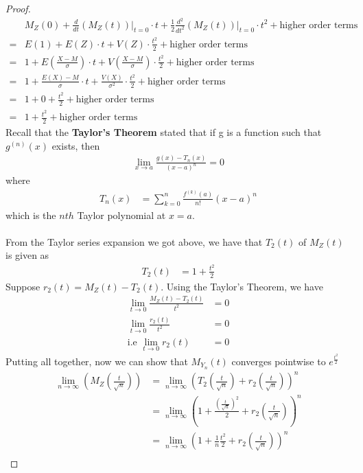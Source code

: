\documentclass[11pt,oneside]{book}
\theoremstyle{break}
\theoremstyle{break}
\begin{document}
\begin{proof}
\begin{align*}
&M_Z(0)+\frac{d}{dt}\left. \left(M_Z(t) \right)\right|_{t=0}\cdot t +\frac{1}{2}\frac{d^2}{dt^2}\left. \left(M_Z(t) \right)\right|_{t=0}\cdot t^2+\text{higher order terms}\\
=&E(1)+E(Z)\cdot t+V(Z)\cdot \frac{t^2}{2}+\text{higher order terms}\\
=&1+E\left(\frac{X-M}{\sigma} \right)\cdot t+V\left(\frac{X-M}{\sigma}\right)\cdot \frac{t^2}{2}+\text{higher order terms}\\
=&1+\frac{E(X)-M}{\sigma}\cdot t+\frac{V(X)}{\sigma^2}\cdot\frac{t^2}{2}+\text{higher order terms}\\
=&1+0+ \frac{t^2}{2}+\text{higher order terms}\\
=&1+\frac{t^2}{2}+\text{higher order terms}
\end{align*}
Recall that the \textbf{Taylor's Theorem} stated that if g is a function such that $g^{(n)}(x)$ exists, then \begin{align*}
\lim_{x\to a}\frac{g(x)-T_n(x)}{(x-a)^n}=0
\end{align*}
where \begin{align*}
T_n(x)&=\sum_{k=0}^{n}\frac{f^{(k)}(a)}{n!}(x-a)^n
\end{align*}
which is the $nth$ Taylor polynomial at $x=a$.\\
\hfill\\
From the Taylor series expansion we got above, we have that $T_2(t)$ of $M_Z(t)$ is given as \begin{align*}
T_2(t)&=1+\frac{t^2}{2}
\end{align*}
Suppose $r_2(t)=M_Z(t)-T_2(t)$. Using the Taylor's Theorem, we have \begin{align*}
\lim_{t\to 0}\frac{M_Z(t)-T_2(t)}{t^2}&=0\\
\lim_{t\to 0}\frac{r_2(t)}{t^2}&=0\\
\text{i.e }\lim_{t\to 0}r_2(t)&=0
\end{align*}
Putting all together, now we can show that $M_{Y_n}(t)$ converges pointwise to $e^{\frac{t^2}{2}}$\begin{align*}
\lim_{n\to \infty}\left(M_Z\left( \frac{t}{\sqrt{n}}\right)\right)&=\lim_{n\to \infty}\left( T_2\left( \frac{t}{\sqrt{n}}\right)+r_2\left(\frac{t}{\sqrt{n}} \right)\right)^n\\
&=\lim_{n\to \infty}\left( 1+\frac{\left(\frac{t}{\sqrt{n}}\right)^2}{2}+r_2\left(\frac{t}{\sqrt{n}} \right)\right)^n\\
&=\lim_{n\to \infty}\left( 1+\frac{1}{n}\frac{t^2}{2}+r_2\left(\frac{t}{\sqrt{n}} \right)\right)^n\\

\end{align*}
\end{proof}
\end{document}
